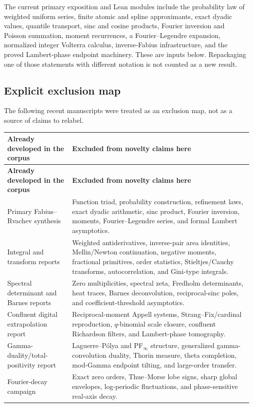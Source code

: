 \documentclass[11pt,oneside]{article}
\theoremstyle{definition}
\theoremstyle{remark}
\begin{document}
\begin{statusbox}
The current primary exposition and Lean modules include the probability law of
weighted uniform series, finite atomic and spline approximants, exact dyadic
values, quantile transport, sinc and cosine products, Fourier inversion and
Poisson summation, moment recurrences, a Fourier--Legendre expansion, normalized
integer Volterra calculus, inverse-Fabius infrastructure, and the proved
Lambert-phase endpoint machinery.  These are inputs below.  Repackaging one of
those statements with different notation is not counted as a new result.
\end{statusbox}

\subsection{Explicit exclusion map}

The following recent manuscripts were treated as an exclusion map, not as a
source of claims to relabel.

\begin{longtable}{@{}p{}p{}@{}}
\toprule
\textbf{Already developed in the corpus} & \textbf{Excluded from novelty claims here}\\
\midrule
\endfirsthead
\toprule
\textbf{Already developed in the corpus} & \textbf{Excluded from novelty claims here}\\
\midrule
\endhead
Primary Fabius--Rvachev synthesis & Function triad, probability construction,
refinement laws, exact dyadic arithmetic, sinc product, Fourier inversion,
moments, Fourier--Legendre series, and formal Lambert asymptotics.\\
Integral and transform reports & Weighted antiderivatives, inverse-pair area
identities, Mellin/Newton continuation, negative moments, fractional primitives,
order statistics, Stieltjes/Cauchy transforms, autocorrelation, and Gini-type
integrals.\\
Spectral determinant and Barnes reports & Zero multiplicities, spectral zeta,
Fredholm determinants, heat traces, Barnes deconvolution, reciprocal-sinc poles,
and coefficient-threshold asymptotics.\\
Confluent digital extrapolation report & Reciprocal-moment Appell systems,
Strang--Fix/cardinal reproduction, $q$-binomial scale closure, confluent
Richardson filters, and Lambert-phase tomography.\\
Gamma-duality/total-positivity report & Laguerre--P\'olya and PF$_\infty$
structure, generalized gamma-convolution duality, Thorin measure, theta
completion, mod-Gamma endpoint tilting, and large-order transfer.\\
Fourier-decay campaign & Exact zero orders, Thue--Morse lobe signs, sharp global
envelopes, log-periodic fluctuations, and phase-sensitive real-axis decay.\\
\bottomrule
\end{longtable}
\end{document}
